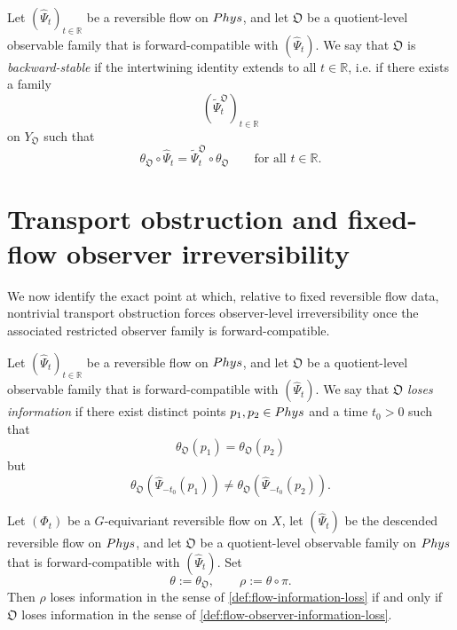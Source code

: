 \begin{definition}
	Let \((\widehat\Psi_t)_{t\in\mathbb R}\) be a reversible flow on
	\(Phys\), and let \(\mathfrak O\) be a quotient-level observable
	family that is forward-compatible with \((\widehat\Psi_t)\).
	We say that \(\mathfrak O\) is \emph{backward-stable} if the
	intertwining identity extends to all \(t\in\mathbb R\), i.e. if there
	exists a family
	\[
		(\widetilde\Psi_t^{\mathfrak O})_{t\in\mathbb R}
	\]
	on \(Y_{\mathfrak O}\) such that
	\[
		\theta_{\mathfrak O}\circ\widehat\Psi_t
		=
		\widetilde\Psi_t^{\mathfrak O}\circ\theta_{\mathfrak O}
		\qquad
		\text{for all }t\in\mathbb R.
	\]
\end{definition}
\section{Transport obstruction and fixed-flow observer irreversibility}
We now identify the exact point at which, relative to fixed reversible
flow data, nontrivial transport obstruction forces observer-level
irreversibility once the associated restricted observer family is
forward-compatible.
\begin{definition}
	\label{def:flow-observer-information-loss}
	Let \((\widehat\Psi_t)_{t\in\mathbb R}\) be a reversible flow on
	\(Phys\), and let \(\mathfrak O\) be a quotient-level observable
	family that is forward-compatible with \((\widehat\Psi_t)\).
	We say that \(\mathfrak O\) \emph{loses information} if there exist
	distinct points \(p_1,p_2\in Phys\) and a time \(t_0>0\) such that
	\[
		\theta_{\mathfrak O}(p_1)=\theta_{\mathfrak O}(p_2)
	\]
	but
	\[
		\theta_{\mathfrak O}(\widehat\Psi_{-t_0}(p_1))
		\neq
		\theta_{\mathfrak O}(\widehat\Psi_{-t_0}(p_2)).
	\]
\end{definition}
\begin{lemma}
	\label{lem:flow-information-loss-compare}
	Let \((\Phi_t)\) be a \(G\)-equivariant reversible flow on \(X\), let
	\((\widehat\Psi_t)\) be the descended reversible flow on \(Phys\), and
	let \(\mathfrak O\) be a quotient-level observable family on
	\(Phys\) that is forward-compatible with \((\widehat\Psi_t)\). Set
	\[
		\theta:=\theta_{\mathfrak O},
		\qquad
		\rho:=\theta\circ\pi.
	\]
	Then \(\rho\) loses information in the sense of
	\cref{def:flow-information-loss} if and only if \(\mathfrak O\) loses
	information in the sense of \cref{def:flow-observer-information-loss}.
\end{lemma}
